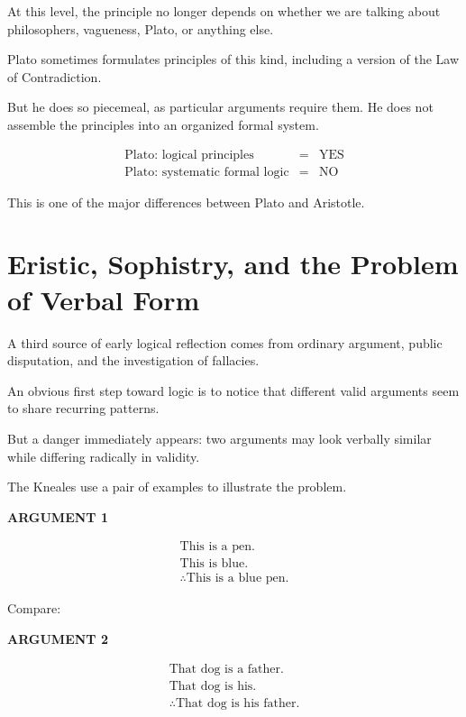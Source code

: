 \documentclass[11pt]{article}
\begin{document}
At this level, the principle no longer depends on whether we are
talking about philosophers, vagueness, Plato, or anything else.

Plato sometimes formulates principles of this kind, including a
version of the Law of Contradiction.

But he does so piecemeal, as particular arguments require them.
He does not assemble the principles into an organized formal
system.

\begin{whiteboard}
\[
\begin{array}{rcl}
\text{Plato: logical principles} & = & \text{YES}\\
\text{Plato: systematic formal logic} & = & \text{NO}
\end{array}
\]
\end{whiteboard}

This is one of the major differences between Plato and Aristotle.

\section{Eristic, Sophistry, and the Problem of Verbal Form}

A third source of early logical reflection comes from ordinary
argument, public disputation, and the investigation of fallacies.

An obvious first step toward logic is to notice that different
valid arguments seem to share recurring patterns.

But a danger immediately appears: two arguments may look
verbally similar while differing radically in validity.

The Kneales use a pair of examples to illustrate the problem.

\begin{whiteboard}
\textbf{ARGUMENT 1}

\[
\begin{array}{l}
\text{This is a pen.}\\
\text{This is blue.}\\
\hline
\therefore \text{This is a blue pen.}
\end{array}
\]
\end{whiteboard}

Compare:

\begin{whiteboard}
\textbf{ARGUMENT 2}

\[
\begin{array}{l}
\text{That dog is a father.}\\
\text{That dog is his.}\\
\hline
\therefore \text{That dog is his father.}
\end{array}
\]
\end{whiteboard}
\end{document}
